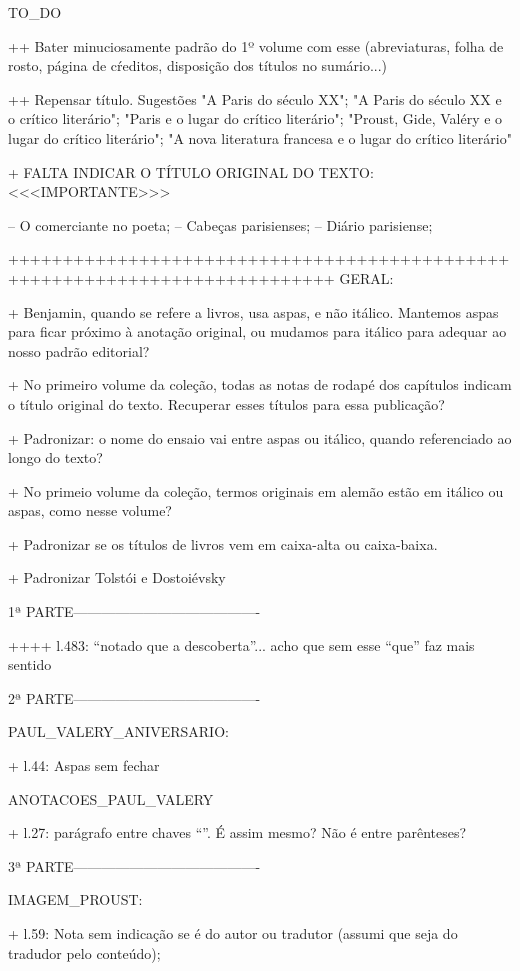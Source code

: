 TO_DO

++ Bater minuciosamente padrão do 1º volume com esse (abreviaturas, folha de rosto, página de cŕeditos, disposição dos títulos no sumário...)

++ Repensar título. Sugestões "A Paris do século XX"; "A Paris do século XX e o crítico literário"; "Paris e o lugar do crítico literário"; "Proust, Gide, Valéry e o lugar do crítico literário"; "A nova literatura francesa e o lugar do crítico literário"

+ FALTA INDICAR O TÍTULO ORIGINAL DO TEXTO: <<<IMPORTANTE>>>

-- O comerciante no poeta;
-- Cabeças parisienses;
-- Diário parisiense;

++++++++++++++++++++++++++++++++++++++++++++++++++++++++++++++++++++++++++++
GERAL:

+ Benjamin, quando se refere a livros, usa aspas, e não itálico. Mantemos aspas para ficar próximo à anotação original, ou mudamos para itálico para adequar ao nosso padrão editorial?

+ No primeiro volume da coleção, todas as notas de rodapé dos capítulos indicam o título original do texto. Recuperar esses títulos para essa publicação?

+ Padronizar: o nome do ensaio vai entre aspas ou itálico, quando referenciado ao longo do texto?

+ No primeio volume da coleção, termos originais em alemão estão em itálico ou aspas, como nesse volume?

+ Padronizar se os títulos de livros vem em caixa-alta ou caixa-baixa.

+ Padronizar Tolstói e Dostoiévsky

1ª PARTE----------------------------------------


++++ l.483: ``notado que a descoberta''... acho que sem esse ``que'' faz mais sentido


2ª PARTE----------------------------------------

PAUL_VALERY_ANIVERSARIO:

+ l.44: Aspas sem fechar


ANOTACOES_PAUL_VALERY

+ l.27: parágrafo entre chaves ``{}''. É assim mesmo? Não é entre parênteses?

3ª PARTE----------------------------------------

IMAGEM_PROUST:

+ l.59: Nota sem indicação se é do autor ou tradutor (assumi que seja do tradudor pelo conteúdo);

